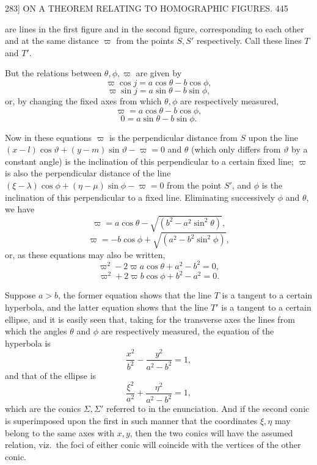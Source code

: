 \documentclass[11pt]{article}
\begin{document}
\begin{center}
\textsc{283]} \hfill ON A THEOREM RELATING TO HOMOGRAPHIC FIGURES. \hfill 445
\end{center}

are lines in the first figure and in the second figure, corresponding to each other
and at the same distance $\varpi$ from the points $S,S'$ respectively. Call these
lines $T$ and $T'$.

But the relations between $\theta,\phi,\varpi$ are given by
\[ \varpi\cos j=a\cos\theta-b\cos\phi, \]
\[ \varpi\sin j=a\sin\theta-b\sin\phi, \]
or, by changing the fixed axes from which $\theta,\phi$ are respectively measured,
\[ \varpi=a\cos\theta-b\cos\phi, \]
\[ 0=a\sin\theta-b\sin\phi. \]

Now in these equations $\varpi$ is the perpendicular distance from $S$ upon the line
$(x-l)\cos\vartheta+(y-m)\sin\vartheta-\varpi=0$ and $\theta$ (which only differs from
$\vartheta$ by a constant angle) is the inclination of this perpendicular to a certain
fixed line; $\varpi$ is also the perpendicular distance of the line
$(\xi-\lambda)\cos\phi+(\eta-\mu)\sin\phi-\varpi=0$ from the point $S'$, and $\phi$
is the inclination of this perpendicular to a fixed line. Eliminating successively
$\phi$ and $\theta$, we have
\[ \varpi=a\cos\theta-\sqrt{(b^{2}-a^{2}\sin^{2}\theta)}, \]
\[ \varpi=-b\cos\phi+\sqrt{(a^{2}-b^{2}\sin^{2}\phi)}, \]
or, as these equations may also be written,
\[ \varpi^{2}-2\varpi a\cos\theta+a^{2}-b^{2}=0, \]
\[ \varpi^{2}+2\varpi b\cos\phi+b^{2}-a^{2}=0. \]

Suppose $a>b$, the former equation shows that the line $T$ is a tangent to a certain
hyperbola, and the latter equation shows that the line $T'$ is a tangent to a certain
ellipse, and it is easily seen that, taking for the transverse axes the lines from
which the angles $\theta$ and $\phi$ are respectively measured, the equation of the
hyperbola is
\[ \dfrac{x^{2}}{b^{2}}-\dfrac{y^{2}}{a^{2}-b^{2}}=1, \]
and that of the ellipse is
\[ \dfrac{\xi^{2}}{a^{2}}+\dfrac{\eta^{2}}{a^{2}-b^{2}}=1, \]
which are the conics $\Sigma,\Sigma'$ referred to in the enunciation. And if the
second conic is superimposed upon the first in such manner that the coordinates
$\xi,\eta$ may belong to the same axes with $x,y$, then the two conics will have the
assumed relation, viz.\ the foci of either conic will coincide with the vertices of
the other conic.
\end{document}
